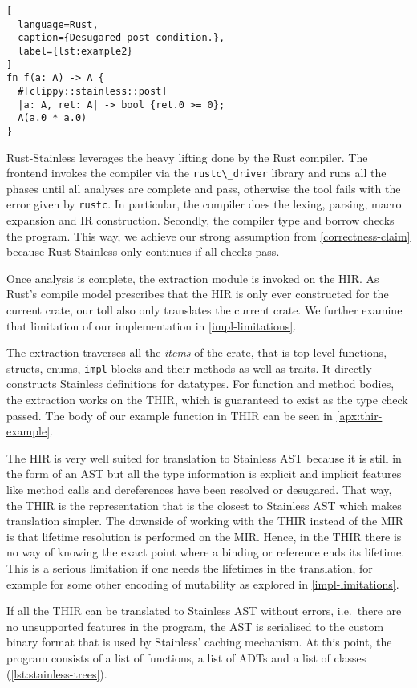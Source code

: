 \begin{lstlisting}[
  language=Rust,
  caption={Desugared post-condition.},
  label={lst:example2}
]
fn f(a: A) -> A {
  #[clippy::stainless::post]
  |a: A, ret: A| -> bool {ret.0 >= 0};
  A(a.0 * a.0)
}
\end{lstlisting}

Rust-Stainless leverages the heavy lifting done by the Rust compiler. The
frontend invokes the compiler via the \passthrough{\lstinline!rustc\_driver!}
library and runs all the phases until all analyses are complete and pass,
otherwise the tool fails with the error given by
\passthrough{\lstinline!rustc!}. In particular, the compiler does the lexing,
parsing, macro expansion and IR construction. Secondly, the compiler type and
borrow checks the program. This way, we achieve our strong assumption from
\autoref{correctness-claim} because Rust-Stainless only continues if all checks
pass.

Once analysis is complete, the extraction module is invoked on the HIR.
As Rust's compile model prescribes that the HIR is only ever constructed
for the current crate, our toll also only translates the current crate.
We further examine that limitation of our implementation in \autoref{impl-limitations}.

The extraction traverses all the \emph{items} of the crate, that is top-level
functions, structs, enums, \passthrough{\lstinline!impl!} blocks and their
methods as well as traits. It directly constructs Stainless definitions for
datatypes. For function and method bodies, the extraction works on the THIR,
which is guaranteed to exist as the type check passed. The body of our example
function in THIR can be seen in \autoref{apx:thir-example}.

The HIR is very well suited for translation to Stainless AST because it is still
in the form of an AST but all the type information is explicit and implicit
features like method calls and dereferences have been resolved or desugared.
That way, the THIR is the representation that is the closest to Stainless AST
which makes translation simpler. The downside of working with the THIR instead
of the MIR is that lifetime resolution is performed on the MIR. Hence, in the
THIR there is no way of knowing the exact point where a binding or reference
ends its lifetime. This is a serious limitation if one needs the lifetimes in
the translation, for example for some other encoding of mutability as explored
in \autoref{impl-limitations}.


If all the THIR can be translated to Stainless AST without errors,
i.e.~there are no unsupported features in the program, the AST is
serialised to the custom binary format that is used by Stainless'
caching mechanism. At this point, the program consists of a list of
functions, a list of ADTs and a list of classes (\autoref{lst:stainless-trees}).

